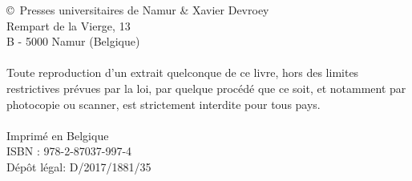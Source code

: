 \null
\vspace{10cm}

\noindent \copyright \ Presses universitaires de Namur \& Xavier Devroey\\
Rempart de la Vierge, 13\\
B - 5000 Namur (Belgique)\\
\\
Toute reproduction d'un extrait quelconque de ce livre, hors des limites restrictives prévues par la loi, par quelque procédé que ce soit, et notamment par photocopie ou scanner, est strictement interdite pour tous pays.\\
\\
Imprimé en Belgique\\
ISBN : 978-2-87037-997-4\\
Dépôt légal: D/2017/1881/35
